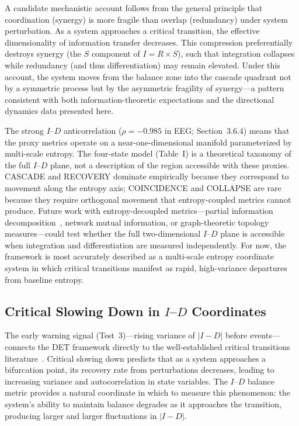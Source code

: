 \documentclass[aip,cha,reprint,amsmath,amssymb,final]{revtex4-2}
\begin{document}
A candidate mechanistic account follows from the general principle that coordination (synergy) is more fragile than overlap (redundancy) under system perturbation. As a system approaches a critical transition, the effective dimensionality of information transfer decreases. This compression preferentially destroys synergy (the $S$ component of $I = R \times S$), such that integration collapses while redundancy (and thus differentiation) may remain elevated. Under this account, the system moves from the balance zone into the cascade quadrant not by a symmetric process but by the asymmetric fragility of synergy---a pattern consistent with both information-theoretic expectations and the directional dynamics data presented here.

The strong $I$--$D$ anticorrelation ($\rho = -0.985$ in EEG; Section~3.6.4) means that the proxy metrics operate on a near-one-dimensional manifold parameterized by multi-scale entropy. The four-state model (Table~I) is a theoretical taxonomy of the full $I$--$D$ plane, not a description of the region accessible with these proxies. CASCADE and RECOVERY dominate empirically because they correspond to movement along the entropy axis; COINCIDENCE and COLLAPSE are rare because they require orthogonal movement that entropy-coupled metrics cannot produce. Future work with entropy-decoupled metrics---partial information decomposition~\cite{williams2010}, network mutual information, or graph-theoretic topology measures---could test whether the full two-dimensional $I$--$D$ plane is accessible when integration and differentiation are measured independently. For now, the framework is most accurately described as a multi-scale entropy coordinate system in which critical transitions manifest as rapid, high-variance departures from baseline entropy.

\subsection{Critical Slowing Down in $I$--$D$ Coordinates}

The early warning signal (Test~3)---rising variance of $|I - D|$ before events---connects the DET framework directly to the well-established critical transitions literature~\cite{scheffer2009,dakos2012}. Critical slowing down predicts that as a system approaches a bifurcation point, its recovery rate from perturbations decreases, leading to increasing variance and autocorrelation in state variables. The $I$--$D$ balance metric provides a natural coordinate in which to measure this phenomenon: the system's ability to maintain balance degrades as it approaches the transition, producing larger and larger fluctuations in $|I - D|$.
\end{document}
